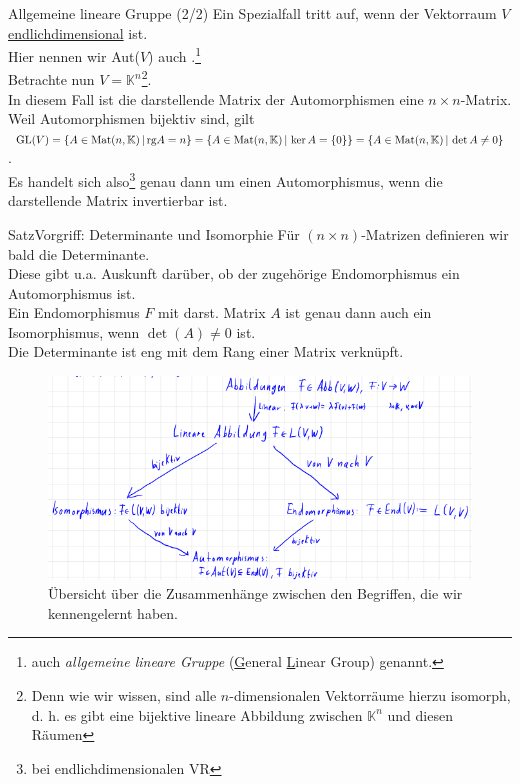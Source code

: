 \begin{Def}{Allgemeine lineare Gruppe (2/2)}
Ein Spezialfall tritt auf, wenn der Vektorraum $V$ \underline{endlichdimensional} ist.\\
Hier nennen wir Aut($V$) auch .\footnote{auch \textit{allgemeine lineare Gruppe} (\underline{G}eneral \underline{L}inear Group) genannt.}\\
Betrachte nun $V=\mathbb{K}^n$\footnote{Denn wie wir wissen, sind alle $n$-dimensionalen Vektorräume hierzu isomorph, d. h. es gibt eine bijektive lineare Abbildung zwischen $\mathbb{K}^n$ und diesen Räumen}.\\
In diesem Fall ist die darstellende Matrix der Automorphismen eine $n\times n$-Matrix.\\
Weil Automorphismen bijektiv sind, gilt\\ $\text{GL}(V)=\{A\in\text{Mat}(n,\mathbb{K})\,|\, \text{rg} A=n\}=\{A\in\text{Mat}(n,\mathbb{K})\,|\, \ker A=\{0\}\}=\{A\in\text{Mat}(n,\mathbb{K})\,|\, \det A \neq 0\}$.\\
Es handelt sich also\footnote{bei endlichdimensionalen VR} genau dann um einen Automorphismus, wenn die darstellende Matrix invertierbar ist.
\end{Def}
\begin{Satz}
{Satz}{Vorgriff: Determinante und Isomorphie}
Für $(n\times n)$-Matrizen definieren wir bald die Determinante.\\
Diese gibt u.a. Auskunft darüber, ob der zugehörige Endomorphismus ein Automorphismus ist.\\
Ein Endomorphismus $F$ mit darst. Matrix $A$ ist genau dann auch ein Isomorphismus, wenn $\det(A)\neq 0$ ist.\\
Die Determinante ist eng mit dem Rang einer Matrix verknüpft.
\end{Satz}
\begin{figure}[htbp]
\centering
\includegraphics[width=.8\textwidth]{Dateien/00/12UbersichtBegriffe.PNG}
\caption*{Übersicht über die Zusammenhänge zwischen den Begriffen, die wir kennengelernt haben.}
\end{figure}

